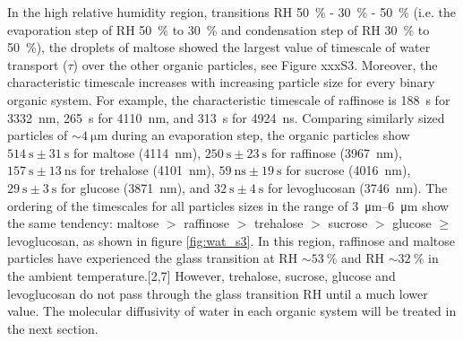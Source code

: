 In the high relative humidity region, transitions RH \SI{50}{\percent} - \SI{30}{\percent} - \SI{50}{\percent} (i.e. the evaporation step of RH \SI{50}{\percent} to \SI{30}{\percent} and condensation step of RH \SI{30}{\percent} to \SI{50}{\percent}), the droplets of maltose showed the largest value of timescale of water transport ($\tau$) over the other organic particles, see Figure xxxS3. Moreover, the characteristic timescale increases with increasing particle size for every binary organic system. For example, the characteristic timescale of raffinose is \SI{188}{\second} for \SI{3332}{\nano\meter}, \SI{265}{\second} for \SI{4110}{\nano\meter}, and \SI{313}{\second} for \SI{4924}{\nano\second}. Comparing similarly sized particles of $\sim \SI{4}{\micro\meter}$ during an evaporation step, the organic particles show $\SI{514}{\second} \pm \SI{31}{\second}$ for maltose (\SI{4114}{\nano\meter}), $\SI{250}{\second} \pm \SI{23}{\second}$ for raffinose (\SI{3967}{\nano\meter}), $\SI{157}{\second} \pm \SI{13}{\nano\second}$ for trehalose (\SI{4101}{\nano\meter}), $\SI{59}{\nano\second} \pm \SI{19}{\second}$ for sucrose (\SI{4016}{\nano\meter}), $\SI{29}{\second} \pm \SI{3}{\second}$ for glucose (\SI{3871}{\nano\meter}), and $\SI{32}{\second} \pm \SI{4}{\second}$ for levoglucosan (\SI{3746}{\nano\meter}). The ordering of the timescales for all particles sizes in the range of \SIrange[range-phrase=-]{3}{6}{\micro\meter} show the same tendency: maltose $>$ raffinose $>$ trehalose $>$ sucrose $>$ glucose $\ge$ levoglucosan, as shown in figure \ref{fig:wat_s3}. In this region, raffinose and maltose particles have experienced the glass transition at RH $\sim \SI{53}{\percent}$ and RH $\sim\SI{32}{\percent}$ in the ambient temperature.[2,7] However, trehalose, sucrose, glucose and levoglucosan do not pass through the glass transition RH until a much lower value. The molecular diffusivity of water in each organic system will be treated in the next section.

